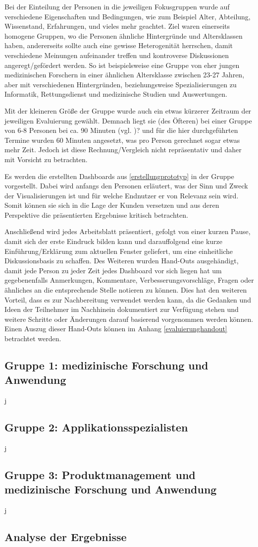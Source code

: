 Bei der Einteilung der Personen in die jeweiligen Fokusgruppen wurde auf verschiedene Eigenschaften und Bedingungen, wie zum Beispiel Alter, Abteilung, Wissenstand, Erfahrungen, und vieles mehr geachtet. 
Ziel waren einerseits homogene Gruppen, wo die Personen ähnliche Hintergründe und Altersklassen haben, andererseits sollte auch eine gewisse Heterogenität herrschen, damit verschiedene Meinungen aufeinander treffen und kontroverse Diskussionen angeregt/gefördert werden.
So ist beispielsweise eine Gruppe von eher jungen medizinischen Forschern in einer ähnlichen Altersklasse zwischen 23-27 Jahren, aber mit verschiedenen Hintergründen, beziehungsweise Spezialisierungen zu Informatik, Rettungsdienst und medizinische Studien und Auswertungen.

Mit der kleineren Größe der Gruppe wurde auch ein etwas kürzerer Zeitraum der jeweiligen Evaluierung gewählt.
Demnach liegt sie (des Öfteren) bei einer Gruppe von 6-8 Personen bei ca. 90 Minuten (vgl. \cite{UsabilityinGermany.})? und für die hier durchgeführten Termine wurden 60 Minuten angesetzt, was pro Person gerechnet sogar etwas mehr Zeit.
Jedoch ist diese Rechnung/Vergleich nicht repräsentativ und daher mit Vorsicht zu betrachten.

Es werden die erstellten Dashboards aus \ref{erstellungprototyp} in der Gruppe vorgestellt. 
Dabei wird anfangs den Personen erläutert, was der Sinn und Zweck der Visualisierungen ist und für welche Endnutzer er von Relevanz sein wird.
Somit können sie sich in die Lage der Kunden versetzen und aus deren Perspektive die präsentierten Ergebnisse kritisch betrachten.

Anschließend wird jedes Arbeitsblatt präsentiert, gefolgt von einer kurzen Pause, damit sich der erste Eindruck bilden kann und darauffolgend eine kurze Einführung/Erklärung zum aktuellen Fenster geliefert, um eine einheitliche Diskussionsbasis zu schaffen.
Des Weiteren wurden Hand-Outs ausgehändigt, damit jede Person zu jeder Zeit jedes Dashboard vor sich liegen hat um gegebenenfalls Anmerkungen, Kommentare, Verbesserungsvorschläge, Fragen oder ähnliches an die entsprechende Stelle notieren zu können.
Dies hat den weiteren Vorteil, dass es zur Nachbereitung verwendet werden kann, da die Gedanken und Ideen der Teilnehmer im Nachhinein dokumentiert zur Verfügung stehen und weitere Schritte oder Änderungen darauf basierend vorgenommen werden können. 
Einen Auszug dieser Hand-Outs können im Anhang \ref{evaluierunghandout} betrachtet werden.

\subsection{Gruppe 1: medizinische Forschung und Anwendung}
j
\subsection{Gruppe 2: Applikationsspezialisten}
j
\subsection{Gruppe 3: Produktmanagement und medizinische Forschung und Anwendung}
j


\subsection{Analyse der Ergebnisse}
